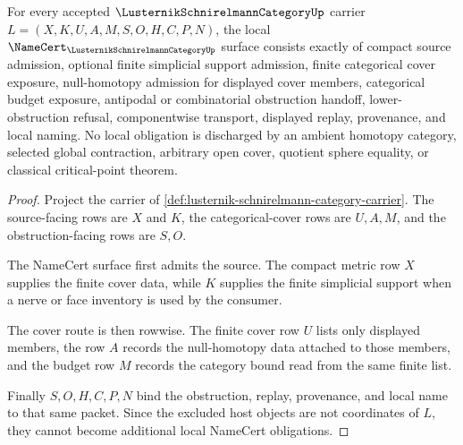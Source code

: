 \begin{theorem}
\label{thm:lusternik-schnirelmann-category-namecert-obligations}
For every accepted $\LusternikSchnirelmannCategoryUp$ carrier $L=(X,K,U,A,M,S,O,H,C,P,N)$, the local $\NameCert_{\LusternikSchnirelmannCategoryUp}$ surface consists exactly of compact source admission, optional finite simplicial support admission, finite categorical cover exposure, null-homotopy admission for displayed cover members, categorical budget exposure, antipodal or combinatorial obstruction handoff, lower-obstruction refusal, componentwise transport, displayed replay, provenance, and local naming. No local obligation is discharged by an ambient homotopy category, selected global contraction, arbitrary open cover, quotient sphere equality, or classical critical-point theorem.
\end{theorem}
\begin{proof}
Project the carrier of \autoref{def:lusternik-schnirelmann-category-carrier}. The source-facing rows are $X$ and $K$, the categorical-cover rows are $U,A,M$, and the obstruction-facing rows are $S,O$.

The NameCert surface first admits the source. The compact metric row $X$ supplies the finite cover data, while $K$ supplies the finite simplicial support when a nerve or face inventory is used by the consumer.

The cover route is then rowwise. The finite cover row $U$ lists only displayed members, the row $A$ records the null-homotopy data attached to those members, and the budget row $M$ records the category bound read from the same finite list.

Finally $S,O,H,C,P,N$ bind the obstruction, replay, provenance, and local name to that same packet. Since the excluded host objects are not coordinates of $L$, they cannot become additional local NameCert obligations.
\end{proof}

